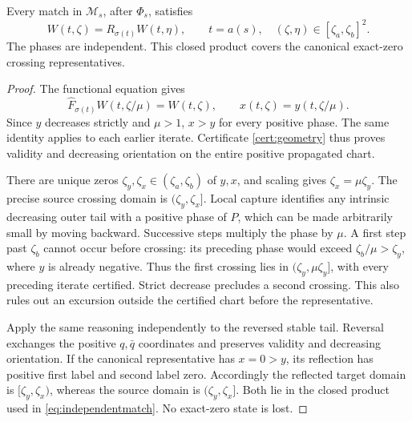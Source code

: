\begin{lemma}\label{lem:coverage}
Every match in \(\mathcal M_s\), after \(\Phi_s\), satisfies
\begin{equation}\label{eq:independentmatch}
 W(t,\zeta)=R_{\sigma(t)}W(t,\eta),\qquad
 t=a(s),\quad (\zeta,\eta)\in[\zeta_a,\zeta_b]^2.
\end{equation}
The phases are independent. This closed product covers the canonical
exact-zero crossing representatives.
\end{lemma}
\begin{proof}
The functional equation gives
\[
 \widehat F_{\sigma(t)}W(t,\zeta/\mu)=W(t,\zeta),\qquad
 x(t,\zeta)=y(t,\zeta/\mu).
\]
Since \(y\) decreases strictly and \(\mu>1\), \(x>y\) for every positive
phase. The same identity applies to each earlier iterate. Certificate
\ref{cert:geometry} thus proves validity and decreasing orientation on
the entire positive propagated chart.

There are unique zeros \(\zeta_y,\zeta_x\in(\zeta_a,\zeta_b)\) of
\(y,x\), and scaling gives \(\zeta_x=\mu\zeta_y\). The precise source
crossing domain is \((\zeta_y,\zeta_x]\). Local capture identifies any
intrinsic decreasing outer tail with a positive phase of \(P\), which can
be made arbitrarily small by moving backward. Successive steps multiply
the phase by \(\mu\). A first step past \(\zeta_b\) cannot occur before
crossing: its preceding phase would exceed
\(\zeta_b/\mu>\zeta_y\), where \(y\) is already negative. Thus the first
crossing lies in \((\zeta_y,\mu\zeta_y]\), with every preceding iterate
certified. Strict decrease precludes a second crossing. This also rules
out an excursion outside the certified chart before the representative.

Apply the same reasoning independently to the reversed stable tail.
Reversal exchanges the positive \(q,\bar q\) coordinates and preserves
validity and decreasing orientation. If the canonical representative
has \(x=0>y\), its reflection has positive first label and second label
zero. Accordingly the reflected target domain is
\([\zeta_y,\zeta_x)\), whereas the source domain is
\((\zeta_y,\zeta_x]\). Both lie in the closed product used in
\eqref{eq:independentmatch}. No exact-zero state is lost.
\end{proof}


